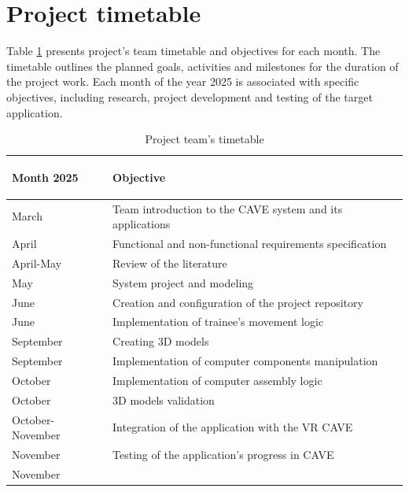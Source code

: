 \section{Project timetable}

Table \ref{tab:timetable} presents project's team timetable and objectives for each month.
The timetable outlines the planned goals, activities and milestones for the duration of the project work.
Each month of the year 2025 is associated with specific objectives, including research, project development and testing of the target application.
\begin{table}[H]
\caption{Project team's timetable}
\label{tab:timetable}
\small
\begin{tabular}{|p{}|p{}|}
\hline
   \begin{center}
       \textbf{Month 2025}
   \end{center}  
   &
   \begin{center}
       \textbf{Objective}
   \end{center}
   \\\hline
    March
    &
    Team introduction to the CAVE system and its applications
    \\\hline
    April 
    &
    Functional and non-functional requirements specification
    \\\hline
    April-May
    & Review of the literature
    \\\hline
    May
    & System project and modeling
    \\\hline
    June
    & Creation and configuration of the project repository
    \\\hline
    June
    & Implementation of trainee's movement logic
    \\\hline
    September
    & Creating 3D models
    \\\hline
    September
    & Implementation of computer components manipulation
    \\\hline
    October
    & Implementation of computer assembly logic
    \\\hline
    October
    & 3D models validation
    \\\hline
    October-November
    & Integration of the application with the VR CAVE
    \\\hline
    November
    & Testing of the application's progress in CAVE
    \\\hline
    November

\end{tabular}
\end{table}
